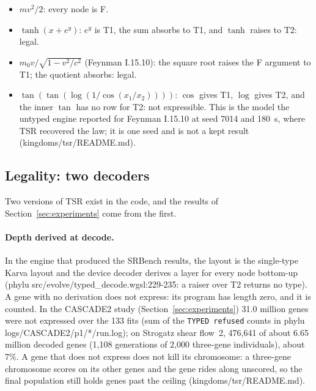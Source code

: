 \documentclass[sigconf,nonacm]{acmart}
\newcommand{\ty}[1]{\textsf{#1}}
\newcommand{\src}[1]{{\small\ttfamily #1}}
\begin{document}
\begin{itemize}
\item $m v^2/2$: every node is \ty{F}.
\item $\tanh(x+e^{y})$: $e^{y}$ is \ty{T1}, the sum absorbs to \ty{T1}, and
$\tanh$ raises to \ty{T2}: legal.
\item $m_0 v/\sqrt{1-v^2/c^2}$ (Feynman I.15.10): the square root raises the
\ty{F} argument to \ty{T1}; the quotient absorbs: legal.
\item $\tan(\tan(\log(1/\cos(x_1/x_2))))$: $\cos$ gives \ty{T1}, $\log$ gives
\ty{T2}, and the inner $\tan$ has no row for \ty{T2}: not expressible. This is
the model the untyped engine reported for Feynman I.15.10 at seed 7014 and 180~s,
where TSR recovered the law; it is one seed and is not a kept result
(\src{kingdoms/\allowbreak{}tsr/\allowbreak{}README.\allowbreak{}md}).
\end{itemize}

\subsection{Legality: two decoders}
\label{sec:legal}

Two versions of TSR exist in the code, and the results of
Section~\ref{sec:experiments} come from the first.

\paragraph{Depth derived at decode.} In the engine that produced the SRBench
results, the layout is the single-type Karva layout and the device decoder
derives a layer for every node bottom-up (\src{phylu
src/\allowbreak{}evolve/\allowbreak{}typed\_\allowbreak{}decode.\allowbreak{}wgsl:229-235}: a raiser over \ty{T2} returns no type).
A gene with no derivation does not express: its program has length zero, and it
is counted. In the CASCADE2 study (Section~\ref{sec:experiments}) 31.0 million
genes were not expressed over the 133 fits (sum of the \texttt{TYPED refused}
counts in \src{phylu logs/\allowbreak{}CASCADE2/\allowbreak{}p1/\allowbreak{}*/\allowbreak{}run.\allowbreak{}log}); on Strogatz shear flow~2,
476{,}641 of about 6.65 million decoded genes (1{,}108 generations of 2{,}000
three-gene individuals), about 7\%. A gene that does not express does not kill
its chromosome: a three-gene chromosome scores on its other genes and the gene
rides along unscored, so the final population still holds genes past the
ceiling (\src{kingdoms/\allowbreak{}tsr/\allowbreak{}README.\allowbreak{}md}).
\end{document}
